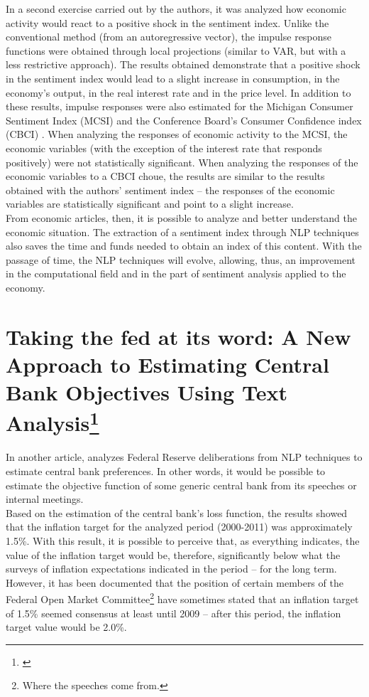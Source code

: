 In a second exercise carried out by the authors, it was analyzed how economic activity would react to a positive shock in the sentiment index. Unlike the conventional method (from an autoregressive vector), the impulse response functions were obtained through local projections \cite{jorda2005estimation} (similar to VAR, but with a less restrictive approach). The results obtained demonstrate that a positive shock in the sentiment index would lead to a slight increase in consumption, in the economy's output, in the real interest rate and in the price level. In addition to these results, impulse responses were also estimated for the Michigan Consumer Sentiment Index (MCSI) and the Conference Board's Consumer Confidence index (CBCI) \cite{shapiro2020measuring}. When analyzing the responses of economic activity to the MCSI, the economic variables (with the exception of the interest rate that responds positively) were not statistically significant. When analyzing the responses of the economic variables to a CBCI choue, the results are similar to the results obtained with the authors' sentiment index -- the responses of the economic variables are statistically significant and point to a slight increase.\\

From economic articles, then, it is possible to analyze and better understand the economic situation. The extraction of a sentiment index through NLP techniques also saves the time and funds needed to obtain an index of this content. With the passage of time, the NLP techniques will evolve, allowing, thus, an improvement in the computational field and in the part of sentiment analysis applied to the economy.\\

\section{Taking the fed at its word: A New Approach to Estimating Central Bank Objectives Using Text Analysis\protect\footnote{\cite{shapiro2021taking}}}

In another article, \cite{shapiro2021taking} analyzes Federal Reserve deliberations from NLP techniques to estimate central bank preferences. In other words, it would be possible to estimate the objective function of some generic central bank from its speeches or internal meetings.\\

Based on the estimation of the central bank's loss function, the results showed that the inflation target for the analyzed period (2000-2011) was approximately 1.5\%. With this result, it is possible to perceive that, as everything indicates, the value of the inflation target would be, therefore, significantly below what the surveys of inflation expectations indicated in the period -- for the long term. However, it has been documented \cite[p.32]{shapiro2021taking} that the position of certain members of the Federal Open Market Committee\footnote{Where the speeches come from.} have sometimes stated that an inflation target of 1.5\% seemed consensus at least until 2009 -- after this period, the inflation target value would be 2.0\%.\\

